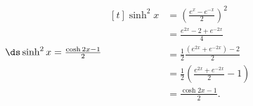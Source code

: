 {$\ds\sinh^2x = \frac{\cosh2x-1}{2}$}
{\hfill$\begin{aligned}[t]
		\sinh^2x &= \left(\frac{e^x-e^{-x}}{2}\right)^2  \\
											&= \frac{e^{2x} - 2 + e^{-2x}}{4} \\
											&= \frac12\frac{(e^{2x}  + e^{-2x})-2}{2}\\
											&= \frac12\left(\frac{e^{2x}  + e^{-2x}}{2}-1\right)\\
											&= \frac{\cosh2x-1}{2}.			
\end{aligned}$\hfill\null}
